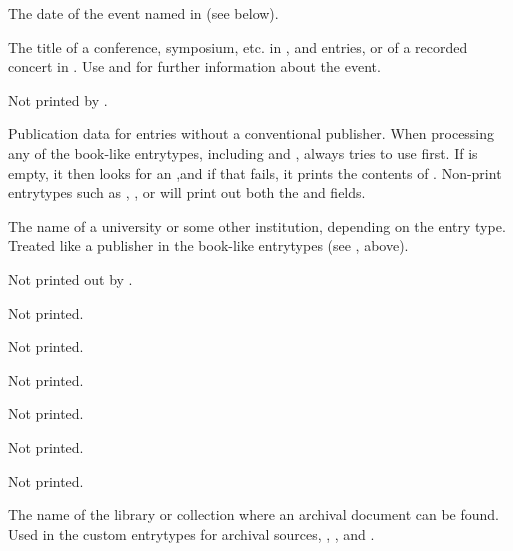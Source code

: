 \documentclass{ltxdockit}[2010/02/12]
\begin{document}
\begin{fieldlist}
The date of the event named in  (see below).


The title of a conference, symposium, etc. in ,  and  entries, or of a recorded concert in . Use  and  for further information about the event.

Not printed by .


Publication data for entries without a conventional publisher. When processing any of the book-like entrytypes, including  and ,  always tries to use  first. If  is empty, it then looks for an ,and if that fails, it prints the contents of . Non-print entrytypes such as , , or  will print out both the  and  fields.


The name of a university or some other institution, depending on the entry type. Treated like a publisher in the book-like entrytypes (see , above).


 Not printed out by .


Not printed.


Not printed.


Not printed.


Not printed.


Not printed.


Not printed.


The name of the library or collection where an archival document can be found. Used in the custom entrytypes for archival sources, , , and .


\end{fieldlist}
\end{document}

